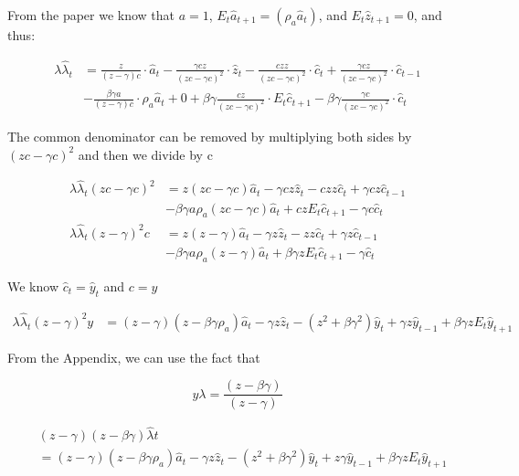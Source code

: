 \documentclass[11pt,preprint, authoryear]{elsarticle}
\numberwithin{equation}{section}
\numberwithin{figure}{section}
\numberwithin{table}{section}
\begin{document}
From the paper we know that \(a=1\),
\(E_t \hat{a}_{t+1} = (\rho_a \hat{a}_t)\), and \(E_t \hat{z}_{t+1}=0\),
and thus:

\[\begin{aligned}
\lambda \hat{\lambda}_t &= 
\frac{z}{(z  -\gamma)c} \cdot  \hat{a}_t
- \frac{ \gamma c z}{(z c- \gamma c)^{2}} \cdot \hat{z}_t 
- \frac{c z z}{(z c-\gamma c)^{2}} \cdot \hat{c}_t
+ \frac{\gamma c z }{(z c-\gamma c)^{2}} \cdot \hat{c}_{t-1} 
\\
& - \frac{\beta \gamma a}{(z-\gamma) c} \cdot \rho_a \hat{a}_t
+ 0
+ \beta \gamma \frac{c z}{(z c-\gamma c)^{2}} \cdot E_t\hat{c}_{t+1}
- \beta \gamma \frac{\gamma c }{(z c-\gamma c)^{2}} \cdot \hat{c}_t
\end{aligned}\]

The common denominator can be removed by multiplying both sides by
\((zc-\gamma c)^2\) and then we divide by c

\[\begin{aligned}
\lambda \hat{\lambda}_t (zc-\gamma c)^2 &= 
z (zc-\gamma c) \hat{a}_t
- \gamma c z \hat{z}_t 
- c z z \hat{c}_t
+ \gamma c z \hat{c}_{t-1} 
\\
& - \beta \gamma a  \rho_a (zc-\gamma c) \hat{a}_t
+ c zE_t\hat{c}_{t+1}
- \gamma c \hat{c}_t\\
\lambda \hat{\lambda}_t (z-\gamma )^2c &=
z (z-\gamma ) \hat{a}_t
- \gamma z \hat{z}_t 
-  z z \hat{c}_t
+ \gamma  z \hat{c}_{t-1} \\
& - \beta \gamma a  \rho_a (z-\gamma ) \hat{a}_t
+ \beta \gamma zE_t\hat{c}_{t+1}
- \gamma \hat{c}_t
\end{aligned}\]

We know \(\hat{c}_t = \hat{y}_t\) and \(c = y\)

\[\begin{aligned}
\lambda \hat{\lambda}_t (z-\gamma)^{2} y &=
(z-\gamma) (z-\beta \gamma \rho_a ) \hat{a}_t
-\gamma z \hat{z}_t
-\left(z^{2} + \beta \gamma^{2}\right) \hat{y}_{t}
+ \gamma z \hat{y}_{t-1}
+ \beta \gamma z E_{t} \hat{y}_{t+1}
\end{aligned}\]

From the Appendix, we can use the fact that

\[y \lambda=\frac{(z-\beta \gamma)}{(z-\gamma)}\]

\[\begin{aligned} &(z-\gamma)(z-\beta \gamma) \hat{\lambda}{t}\\ 
& = (z-\gamma)\left(z-\beta \gamma \rho_{a}\right) \hat{a}_{t}-\gamma z \hat{z}_{t}-\left(z^{2}+\beta \gamma^{2}\right) \hat{y}_{t}+z \gamma \hat{y}_{t-1} + \beta \gamma z E_{t} \hat{y}_{t+1}
\end{aligned}\]
\end{document}
